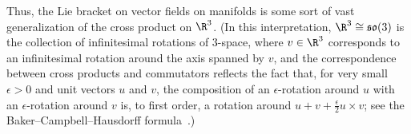 \begin{example}
	Thus, the Lie bracket on vector fields on manifolds is some sort of vast generalization of the cross product on $\R^3$. (In this interpretation, $\R^3 \cong \mathfrak{so}(3)$ is the collection of infinitesimal rotations of 3-space, where $v \in \R^3$ corresponds to an infinitesimal rotation around the axis spanned by $v$, and the correspondence between cross products and commutators reflects the fact that, for very small $\epsilon > 0$ and unit vectors $u$ and $v$, the composition of an $\epsilon$-rotation around $u$ with an $\epsilon$-rotation around $v$ is, to first order, a rotation around $u + v + \frac{\epsilon}{2} u \times v$; see the Baker--Campbell--Hausdorff formula~\cite[Chapter~5]{hallLieGroupsLie2015}.)
\end{example}